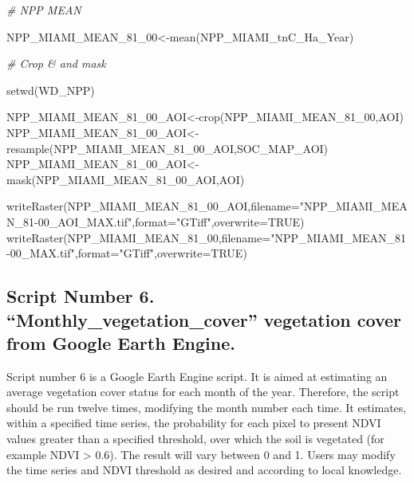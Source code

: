 \documentclass[
  10pt,
  b5paper,
]{book}
\newenvironment{Shaded}{\begin{snugshade}}{\end{snugshade}}
\newcommand{\AttributeTok}[1]{\textcolor[rgb]{0.77,0.63,0.00}{#1}}
\newcommand{\CommentTok}[1]{\textcolor[rgb]{0.56,0.35,0.01}{\textit{#1}}}
\newcommand{\ConstantTok}[1]{\textcolor[rgb]{0.00,0.00,0.00}{#1}}
\newcommand{\FunctionTok}[1]{\textcolor[rgb]{0.00,0.00,0.00}{#1}}
\newcommand{\NormalTok}[1]{#1}
\newcommand{\OtherTok}[1]{\textcolor[rgb]{0.56,0.35,0.01}{#1}}
\newcommand{\StringTok}[1]{\textcolor[rgb]{0.31,0.60,0.02}{#1}}
\begin{document}
\begin{Shaded}
\begin{Highlighting}[]
\CommentTok{\# NPP MEAN}

\NormalTok{NPP\_MIAMI\_MEAN\_81\_00}\OtherTok{\textless{}{-}}\FunctionTok{mean}\NormalTok{(NPP\_MIAMI\_tnC\_Ha\_Year)}

\CommentTok{\# Crop \& and mask}

\FunctionTok{setwd}\NormalTok{(WD\_NPP)}

\NormalTok{NPP\_MIAMI\_MEAN\_81\_00\_AOI}\OtherTok{\textless{}{-}}\FunctionTok{crop}\NormalTok{(NPP\_MIAMI\_MEAN\_81\_00,AOI)}
\NormalTok{NPP\_MIAMI\_MEAN\_81\_00\_AOI}\OtherTok{\textless{}{-}}\FunctionTok{resample}\NormalTok{(NPP\_MIAMI\_MEAN\_81\_00\_AOI,SOC\_MAP\_AOI)}
\NormalTok{NPP\_MIAMI\_MEAN\_81\_00\_AOI}\OtherTok{\textless{}{-}}\FunctionTok{mask}\NormalTok{(NPP\_MIAMI\_MEAN\_81\_00\_AOI,AOI)}

\FunctionTok{writeRaster}\NormalTok{(NPP\_MIAMI\_MEAN\_81\_00\_AOI,}\AttributeTok{filename=}\StringTok{"NPP\_MIAMI\_MEAN\_81{-}00\_AOI\_MAX.tif"}\NormalTok{,}\AttributeTok{format=}\StringTok{"GTiff"}\NormalTok{,}\AttributeTok{overwrite=}\ConstantTok{TRUE}\NormalTok{)}
\FunctionTok{writeRaster}\NormalTok{(NPP\_MIAMI\_MEAN\_81\_00,}\AttributeTok{filename=}\StringTok{"NPP\_MIAMI\_MEAN\_81{-}00\_MAX.tif"}\NormalTok{,}\AttributeTok{format=}\StringTok{"GTiff"}\NormalTok{,}\AttributeTok{overwrite=}\ConstantTok{TRUE}\NormalTok{)}
\end{Highlighting}
\end{Shaded}

\hypertarget{script-number-6.-monthly_vegetation_cover-vegetation-cover-from-google-earth-engine.}{%
\subsection{Script Number 6. ``Monthly\_vegetation\_cover'' vegetation cover from Google Earth Engine.}\label{script-number-6.-monthly_vegetation_cover-vegetation-cover-from-google-earth-engine.}}

Script number 6 is a Google Earth Engine script. It is aimed at estimating an average vegetation cover status for each month of the year. Therefore, the script should be run twelve times, modifying the month number each time. It estimates, within a specified time series, the probability for each pixel to present NDVI values greater than a specified threshold, over which the soil is vegetated (for example NDVI \textgreater{} 0.6). The result will vary between 0 and 1. Users may modify the time series and NDVI threshold as desired and according to local knowledge.
\end{document}
